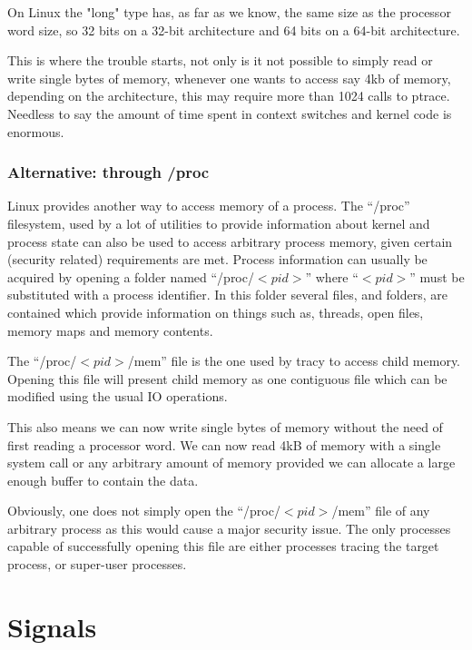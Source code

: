 \documentclass[a4paper, 10pt]{report}
\begin{document}
On Linux the "long" type has, as far as we know, the same size as the
processor word size, so 32 bits on a 32-bit architecture and
64 bits on a 64-bit architecture.

This is where the trouble starts, not only is it not possible to simply read
or write single bytes of memory, whenever one wants to access say 4kb of
memory, depending on the architecture, this may require more than 1024
calls to ptrace. Needless to say the amount of time spent in context switches
and kernel code is enormous.

\subsubsection{Alternative: through /proc}
Linux provides another way to access memory of a process. The ``/proc''
filesystem, used by a lot of utilities to provide information about kernel
and process state can also be used to access arbitrary process memory,
given certain (security related) requirements are met.
Process information can usually be acquired by opening a folder
named ``/proc/$<pid>$'' where ``$<pid>$'' must be substituted with a process
identifier. In this folder several files, and folders, are contained which
provide information on things such as, threads, open files, memory maps and
memory contents.

The ``/proc/$<pid>$/mem'' file is the one used by tracy to access child memory.
Opening this file will present child memory as one contiguous file which
can be modified using the usual IO operations.

This also means we can now write single bytes of memory without the need
of first reading a processor word. We can now read 4kB of memory with a
single system call or any arbitrary amount of memory provided we can allocate
a large enough buffer to contain the data.

Obviously, one does not simply open the ``/proc/$<pid>$/mem'' file of any
arbitrary process as this would cause a major security issue. The only
processes capable of successfully opening this file are either processes
tracing the target process, or super-user processes.


\section{Signals}
\end{document}
